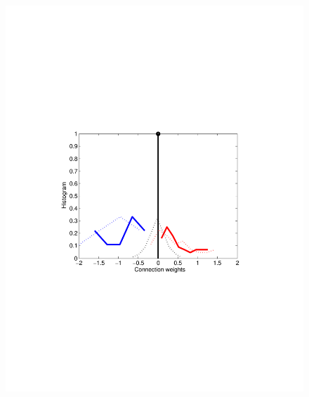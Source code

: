 \begin{figure}[h]
\begin{minipage}[c]{0.3\hsize}
\includegraphics[width=\hsize]{../figs/FigureA3_hist_mcmc}
\end{minipage}
\begin{minipage}[c]{0.3\hsize}

\end{minipage}
\end{figure}
